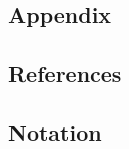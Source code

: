 \documentclass[11pt,a4paper]{scrartcl}		%
\begin{document}
\begin{appendix}
\section{Appendix}

\bigskip



\subsection{References}

\begin{flushleft}
\renewcommand{\refname}{}
\singlespacing
%
{\def\section*#1{}}
\end{flushleft}



\bigskip

\subsection{Notation}


\end{appendix}
\end{document}
